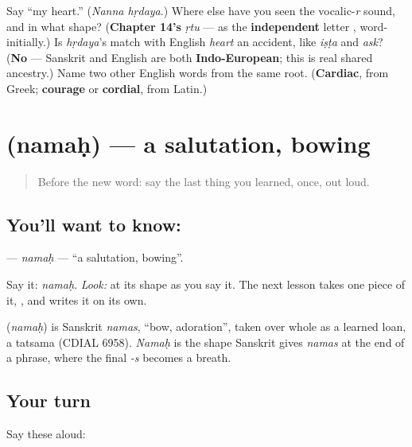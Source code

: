 \begin{tcolorbox}[breakable,colback=teal!4,colframe=teal!35!black,title={Before you move on}]
Say \textquotedblleft{}my heart.\textquotedblright{} (\emph{Nanna hṛdaya}.) Where else have you seen the vocalic-\emph{r} sound, and in what shape? (\textbf{Chapter 14's} \emph{ṛtu} — as the \textbf{independent} letter , word-initially.) Is \emph{hṛdaya}'s match with English \emph{heart} an accident, like \emph{iṣṭa} and \emph{ask}? (\textbf{No} — Sanskrit and English are both \textbf{Indo-European}; this is real shared ancestry.) Name two other English words from the same root. (\textbf{Cardiac}, from Greek; \textbf{courage} or \textbf{cordial}, from Latin.)
\end{tcolorbox}
\section[\texorpdfstring{\kn{ನಮಃ} (namaḥ)}{ನಮಃ (namaḥ)}]{ (namaḥ) — a salutation, bowing}

\label{lesson:KA-C38-namah}



\begin{quote}
Before the new word: say the last thing you learned, once, out loud.
\end{quote}

\subsection*{You'll want to know: }
\textbf{} — \emph{namaḥ} — \textquotedblleft{}a salutation, bowing\textquotedblright{}.

Say it: \emph{namaḥ}. \emph{Look:} at its shape as you say it. The next lesson takes one piece of it, \textbf{}, and writes it on its own.

\begin{cousinweb}
\textbf{} (\emph{namaḥ}) is Sanskrit \emph{namas}, \textquotedblleft{}bow, adoration\textquotedblright{}, taken over whole as a learned loan, a tatsama (CDIAL 6958). \emph{Namaḥ} is the shape Sanskrit gives \emph{namas} at the end of a phrase, where the final \emph{-s} becomes a breath.
\end{cousinweb}

\subsection*{Your turn}
Say these aloud:


